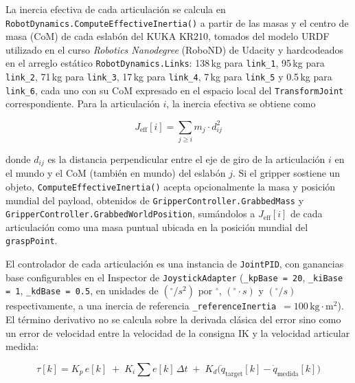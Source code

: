 La inercia efectiva de cada articulación se calcula en \texttt{RobotDynamics.ComputeEffectiveInertia()} a partir de las masas y el centro de masa (CoM) de cada eslabón del KUKA KR210, tomados del modelo URDF utilizado en el curso \textit{Robotics Nanodegree} (RoboND) de Udacity y hardcodeados en el arreglo estático \texttt{RobotDynamics.Links}: 138\,kg para \texttt{link\_1}, 95\,kg para \texttt{link\_2}, 71\,kg para \texttt{link\_3}, 17\,kg para \texttt{link\_4}, 7\,kg para \texttt{link\_5} y 0.5\,kg para \texttt{link\_6}, cada uno con su CoM expresado en el espacio local del \texttt{TransformJoint} correspondiente. Para la articulación $i$, la inercia efectiva se obtiene como

\begin{equation}
    J_{\text{eff}}[i] = \sum_{j \geq i} m_j \cdot d_{ij}^2
    \label{eq:jeff}
\end{equation}

donde $d_{ij}$ es la distancia perpendicular entre el eje de giro de la articulación $i$ en el mundo y el CoM (también en mundo) del eslabón $j$. Si el gripper sostiene un objeto, \texttt{ComputeEffectiveInertia()} acepta opcionalmente la masa y posición mundial del payload, obtenidos de \texttt{GripperController.\allowbreak GrabbedMass} y \texttt{GripperController.\allowbreak GrabbedWorldPosition}, sumándolos a $J_{\text{eff}}[i]$ de cada articulación como una masa puntual ubicada en la posición mundial del \texttt{graspPoint}.

El controlador de cada articulación es una instancia de \texttt{JointPID}, con ganancias base configurables en el Inspector de \texttt{JoystickAdapter} (\texttt{\_kpBase = 20}, \texttt{\_kiBase = 1}, \texttt{\_kdBase = 0.5}, en unidades de $({^\circ}/s^2)$ por ${^\circ}$, $({^\circ}{\cdot}s)$ y $({^\circ}/s)$ respectivamente, a una inercia de referencia \texttt{\_referenceInertia}~$= 100\,\mathrm{kg{\cdot}m^2}$). El término derivativo no se calcula sobre la derivada clásica del error sino como un error de velocidad entre la velocidad de la consigna IK y la velocidad articular medida:

\begin{equation}
    \tau[k] = K_p \, e[k] \;+\; K_i \sum e[k]\,\Delta t \;+\; K_d \bigl(\dot{q}_{\text{target}}[k] - \dot{q}_{\text{medida}}[k]\bigr)
    \label{eq:pid}
\end{equation}

